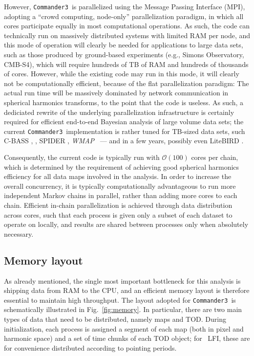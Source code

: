 \documentclass[twocolumn]{aa}
\def\WMAP{\emph{WMAP}}
\def\commanderthree{\texttt{Commander3}}
\begin{document}
However, \commanderthree\ is parallelized using the Message Passing
Interface (MPI), adopting a ``crowd computing, node-only''
parallelization paradigm, in which all cores participate equally in
most computational operations. As such, the code can technically run
on massively distributed systems with limited RAM per node, and this mode
of operation will clearly be needed for applications to large data sets,
such as those produced by ground-based experiments (e.g., Simons
Observatory, CMB-S4), which will require hundreds of TB of RAM and
hundreds of thousands of cores. However, while the existing code may
run in this mode, it will clearly not be computationally efficient,
because of the flat parallelization paradigm: The actual run time will
be massively dominated by network communication in spherical harmonics
transforms, to the point that the code is useless. As such, a
dediciated rewrite of the underlying parallelization infrastructure is
certainly required for efficient end-to-end Bayesian analysis of large
volume data sets; the current \commanderthree\ implementation is
rather tuned for TB-sized data sets, such C-BASS \citep{cbass}, \Planck, SPIDER \citep{spider},
\WMAP\ \citep{wmap} --- and in a few years, possibly even LiteBIRD \citep{LiteBIRD}.

Consequently, the current code is typically run with
$\mathcal{O}(100)$ cores per chain, which is determined by the
requirement of achieving good spherical harmonics efficiency for all
data maps involved in the analysis. In order to increase the overall
concurrency, it is typically computationally advantageous to run more
independent Markov chains in parallel, rather than adding more cores
to each chain. Efficient in-chain parallelization is achieved through
data distribution across cores, such that each process is given only a
subset of each dataset to operate on locally, and results are shared
between processes only when absolutely necessary.

\subsection{Memory layout}
\label{sec:mem_layout}

As already mentioned, the single most important bottleneck for this
analysis is shipping data from RAM to the CPU, and an efficient memory
layout is therefore essential to maintain high throughput. The layout
adopted for \commanderthree\ is schematically illustrated in
Fig.~\ref{fig:memory}. In particular, there are two main types of data
that need to be distributed, namely maps and TOD. During
initialization, each process is assigned a segment of each map (both
in pixel and harmonic space) and a set of time chunks of each TOD
object; for \Planck\ LFI, these are for convenience distributed
according to pointing periods.
\end{document}
